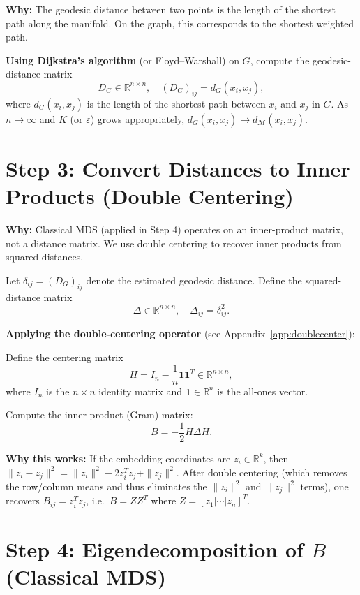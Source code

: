 \documentclass[11pt]{article}
\begin{document}
\textbf{Why:} The geodesic distance between two points is the length of the shortest
path along the manifold. On the graph, this corresponds to the shortest weighted path.

\textbf{Using Dijkstra's algorithm} (or Floyd–Warshall) on $G$, compute the
geodesic-distance matrix
\[
  D_G \in \mathbb{R}^{n \times n}, \quad (D_G)_{ij} = d_G(x_i, x_j),
\]
where $d_G(x_i, x_j)$ is the length of the shortest path between $x_i$ and $x_j$ in
$G$. As $n \to \infty$ and $K$ (or $\varepsilon$) grows appropriately,
$d_G(x_i, x_j) \to d_{\mathcal{M}}(x_i, x_j)$.

\section*{Step 3: Convert Distances to Inner Products (Double Centering)}

\textbf{Why:} Classical MDS (applied in Step 4) operates on an inner-product matrix,
not a distance matrix. We use double centering to recover inner products from squared
distances.

Let $\delta_{ij} = (D_G)_{ij}$ denote the estimated geodesic distance. Define the
squared-distance matrix
\[
  \Delta \in \mathbb{R}^{n \times n}, \quad \Delta_{ij} = \delta_{ij}^2.
\]

\textbf{Applying the double-centering operator} (see Appendix~\ref{app:doublecenter}):

Define the centering matrix
\[
  H = I_n - \frac{1}{n}\mathbf{1}\mathbf{1}^T \in \mathbb{R}^{n \times n},
\]
where $I_n$ is the $n \times n$ identity matrix and $\mathbf{1} \in \mathbb{R}^n$ is
the all-ones vector.

Compute the inner-product (Gram) matrix:
\[
  \boxed{B = -\frac{1}{2} H \Delta H.}
\]

\textbf{Why this works:} If the embedding coordinates are $z_i \in \mathbb{R}^k$,
then $\|z_i - z_j\|^2 = \|z_i\|^2 - 2z_i^T z_j + \|z_j\|^2$. After double
centering (which removes the row/column means and thus eliminates the $\|z_i\|^2$
and $\|z_j\|^2$ terms), one recovers $B_{ij} = z_i^T z_j$, i.e.\ $B = ZZ^T$ where
$Z = [z_1|\cdots|z_n]^T$.

\section*{Step 4: Eigendecomposition of $B$ (Classical MDS)}
\end{document}
